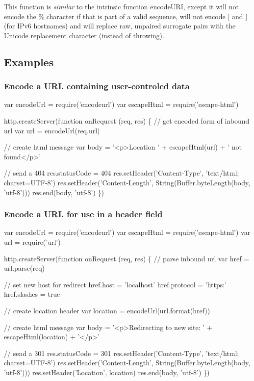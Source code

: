 This function is {\itshape similar} to the intrinsic function {\ttfamily encode\+U\+RI}, except it will not encode the {\ttfamily \%} character if that is part of a valid sequence, will not encode {\ttfamily \mbox{[}} and {\ttfamily \mbox{]}} (for I\+Pv6 hostnames) and will replace raw, unpaired surrogate pairs with the Unicode replacement character (instead of throwing).

\subsection*{Examples}

\subsubsection*{Encode a U\+RL containing user-\/controled data}


\begin{DoxyCode}
var encodeUrl = require('encodeurl')
var escapeHtml = require('escape-html')

http.createServer(function onRequest (req, res) \{
  // get encoded form of inbound url
  var url = encodeUrl(req.url)

  // create html message
  var body = '<p>Location ' + escapeHtml(url) + ' not found</p>'

  // send a 404
  res.statusCode = 404
  res.setHeader('Content-Type', 'text/html; charset=UTF-8')
  res.setHeader('Content-Length', String(Buffer.byteLength(body, 'utf-8')))
  res.end(body, 'utf-8')
\})
\end{DoxyCode}


\subsubsection*{Encode a U\+RL for use in a header field}


\begin{DoxyCode}
var encodeUrl = require('encodeurl')
var escapeHtml = require('escape-html')
var url = require('url')

http.createServer(function onRequest (req, res) \{
  // parse inbound url
  var href = url.parse(req)

  // set new host for redirect
  href.host = 'localhost'
  href.protocol = 'https:'
  href.slashes = true

  // create location header
  var location = encodeUrl(url.format(href))

  // create html message
  var body = '<p>Redirecting to new site: ' + escapeHtml(location) + '</p>'

  // send a 301
  res.statusCode = 301
  res.setHeader('Content-Type', 'text/html; charset=UTF-8')
  res.setHeader('Content-Length', String(Buffer.byteLength(body, 'utf-8')))
  res.setHeader('Location', location)
  res.end(body, 'utf-8')
\})
\end{DoxyCode}


